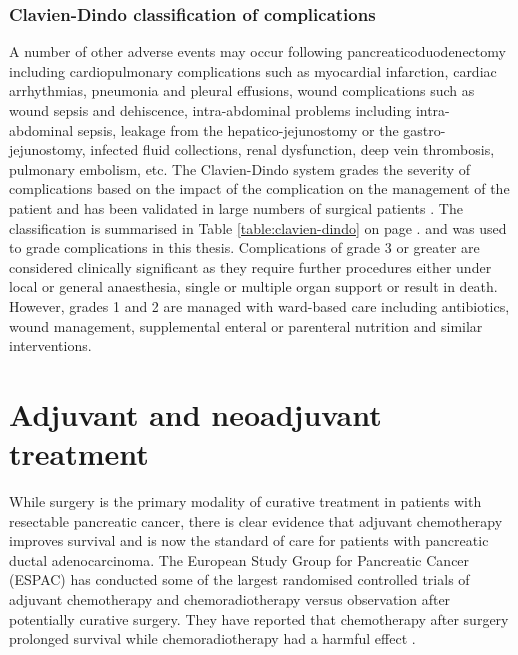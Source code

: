 \subsubsection{Clavien-Dindo classification of complications}

A number of other adverse events may occur following pancreaticoduodenectomy including cardiopulmonary complications such as myocardial infarction, cardiac arrhythmias, pneumonia and pleural effusions, wound complications such as wound sepsis and dehiscence, intra-abdominal problems including intra-abdominal sepsis, leakage from the hepatico-jejunostomy or the gastro-jejunostomy, infected fluid collections, renal dysfunction, deep vein thrombosis, pulmonary embolism, etc. 
The Clavien-Dindo system grades the severity of complications based on the impact of the complication on the management of the patient and has been validated in large numbers of surgical patients \parencite{clavien_clavien-dindo_2009, dindo_classification_2004}. 
The classification is summarised in Table \ref{table:clavien-dindo} on page \pageref{table:clavien-dindo}. 
and was used to grade complications in this thesis. 
Complications of grade 3 or greater are considered clinically significant as they require further procedures either under local or general anaesthesia, single or multiple organ support or result in death.
However, grades 1 and 2 are managed with ward-based care including antibiotics, wound management, supplemental enteral or parenteral nutrition and similar interventions.

\section{Adjuvant and neoadjuvant treatment}

While surgery is the primary modality of curative treatment in patients with resectable pancreatic cancer, there is clear evidence that adjuvant chemotherapy improves survival and is now the standard of care for patients with pancreatic ductal adenocarcinoma. 
The European Study Group for Pancreatic Cancer (ESPAC) has conducted some of the largest randomised controlled trials of adjuvant chemotherapy and chemoradiotherapy versus observation after potentially curative surgery.
They have reported that chemotherapy after surgery prolonged survival while chemoradiotherapy had a harmful effect \parencite{neoptolemos_adjuvant_2001, neoptolemos_randomized_2004, neoptolemos_adjuvant_2009, neoptolemos_adjuvant_2010}. 

